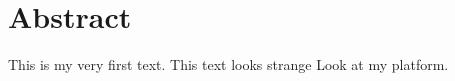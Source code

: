 \chapter*{Abstract}

This is my very first text.
This text looks strange
Look at my \pricewars platform.